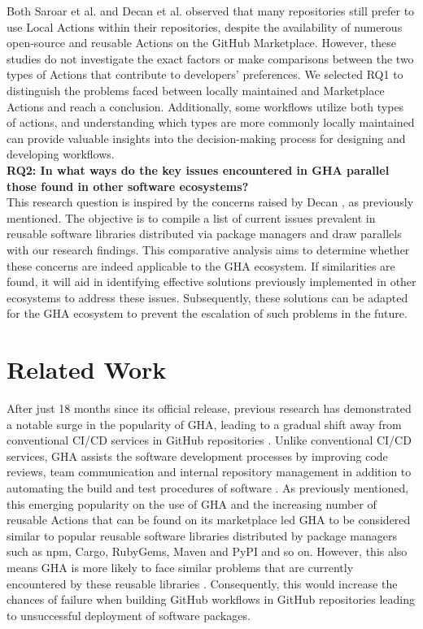 \documentclass[conference]{IEEEtran}
\begin{document}
    Both Saroar et al. \cite{saroar2023developers} and Decan et al. \cite{decan2022use} observed that many repositories still prefer to use Local Actions within their repositories, despite the availability of numerous open-source and reusable Actions on the GitHub Marketplace. However, these studies do not investigate the exact factors or make comparisons between the two types of Actions that contribute to developers' preferences. We selected RQ1 to distinguish the problems faced between locally maintained and Marketplace Actions and reach a conclusion. Additionally, some workflows utilize both types of actions, and understanding which types are more commonly locally maintained can provide valuable insights into the decision-making process for designing and developing workflows. \\

 \textbf{RQ2: In what ways do the key issues encountered in GHA parallel those found in other software ecosystems?}\\

    This research question is inspired by the concerns raised by Decan \cite{decan2022use}, as previously mentioned. The objective is to compile a list of current issues prevalent in reusable software libraries distributed via package managers and draw parallels with our research findings. This comparative analysis aims to determine whether these concerns are indeed applicable to the GHA ecosystem. If similarities are found, it will aid in identifying effective solutions previously implemented in other ecosystems to address these issues. Subsequently, these solutions can be adapted for the GHA ecosystem to prevent the escalation of such problems in the future.




\section{Related Work}
    After just 18 months since its official release, previous research has demonstrated a notable surge in the popularity of GHA, leading to a gradual shift away from conventional CI/CD services in GitHub repositories \cite{golzadeh2021rise}. Unlike conventional CI/CD services, GHA assists the software development processes by improving code reviews, team communication and internal repository management in addition to automating the build and test procedures of software \cite{chandrasekara2021hands}. As previously mentioned, this emerging popularity on the use of GHA and the increasing number of reusable Actions that can be found on its marketplace led GHA to be considered similar to popular reusable software libraries distributed by package managers such as npm, Cargo, RubyGems, Maven and PyPI and so on. However, this also means GHA is more likely to face similar problems that are currently encountered by these reusable libraries \cite{decan2022use}. Consequently, this would increase the chances of failure when building GitHub workflows in GitHub repositories leading to unsuccessful deployment of software packages. \\
\end{document}
